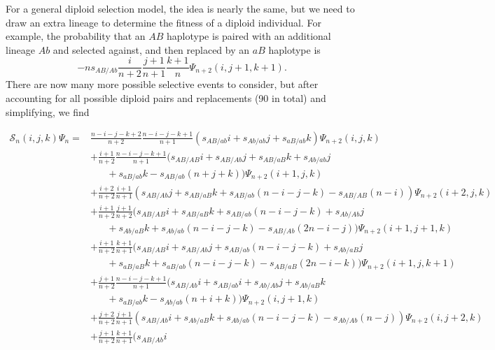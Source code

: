 \documentclass[]{article}
\begin{document}
For a general diploid selection model, the idea is nearly the same, but we need
to draw an extra lineage to determine the fitness of a diploid individual. For
example, the probability that an \(AB\) haplotype is paired with an additional
lineage \(Ab\) and selected against, and then replaced by an \(aB\) haplotype is
\[-ns_{AB/Ab}\frac{i}{n+2}\frac{j+1}{n+1}\frac{k+1}{n}\Psi_{n+2}(i, j+1,
k+1).\] There are now many more possible selective events to consider, but
after accounting for all possible diploid pairs and replacements (90 in total)
and simplifying, we find

\begin{align}
\mathcal{S}_{n}(i, j, k)\Psi_n = &
\frac{n-i-j-k+2}{n+2}\frac{n-i-j-k+1}{n+1}\left(
  s_{AB/ab}i
  + s_{Ab/ab}j
  + s_{aB/ab}k
\right)\Psi_{n+2}(i,j,k) \\\nonumber
& + \frac{i+1}{n+2}\frac{n-i-j-k+1}{n+1}(
  s_{AB/AB}i
  + s_{AB/Ab}j
  + s_{AB/aB}k
  + s_{Ab/ab}j \\\nonumber & \hspace{20pt}
  + s_{aB/ab}k
  - s_{AB/ab}(n + j + k)
)\Psi_{n+2}(i+1, j, k) \\\nonumber
& + \frac{i+2}{n+2}\frac{i+1}{n+1}(
  s_{AB/Ab}j
  + s_{AB/aB}k
  + s_{AB/ab}(n-i-j-k)
  - s_{AB/AB}(n-i)
)\Psi_{n+2}(i+2, j, k) \\\nonumber
& + \frac{i+1}{n+2}\frac{j+1}{n+2}(
  s_{AB/AB}i
  + s_{AB/aB}k
  + s_{AB/ab}(n-i-j-k)
  + s_{Ab/Ab}j \\\nonumber & \hspace{20pt}
  + s_{Ab/aB}k
  + s_{Ab/ab}(n-i-j-k)
  - s_{AB/Ab}(2n-i-j)
)\Psi_{n+2}(i+1, j+1, k) \\\nonumber
& + \frac{i+1}{n+2}\frac{k+1}{n+1}(
  s_{AB/AB}i
  + s_{AB/Ab}j
  + s_{AB/ab}(n-i-j-k)
  + s_{Ab/aB}j \\\nonumber & \hspace{20pt}
  + s_{aB/aB}k
  + s_{aB/ab}(n-i-j-k)
  - s_{AB/aB}(2n-i-k)
)\Psi_{n+2}(i+1, j, k+1) \\\nonumber
& + \frac{j+1}{n+2}\frac{n-i-j-k+1}{n+1}(
  s_{AB/Ab}i
  + s_{AB/ab}i
  + s_{Ab/Ab}j
  + s_{Ab/aB}k \\\nonumber & \hspace{20pt}
  + s_{aB/ab}k
  -s_{Ab/ab}(n+i+k)
)\Psi_{n+2}(i, j+1, k) \\\nonumber
& + \frac{j+2}{n+2}\frac{j+1}{n+1}(
s_{AB/Ab}i + s_{Ab/aB}k + s_{Ab/ab}(n-i-j-k) - s_{Ab/Ab}(n-j)
)\Psi_{n+2}(i, j+2, k) \\\nonumber
& + \frac{j+1}{n+2}\frac{k+1}{n+1}(
  s_{AB/Ab}i

\end{align}
\end{document}

